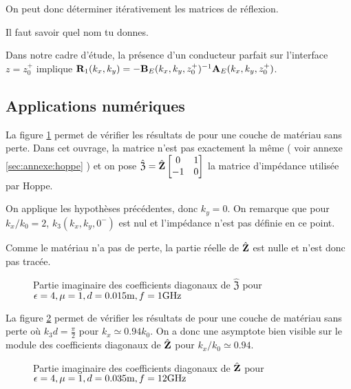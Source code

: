     On peut donc déterminer itérativement les matrices de réflexion.
    \begin{REM}
      Il faut savoir quel nom tu donnes.
    \end{REM}
    Dans notre cadre d'étude, la présence d'un conducteur parfait sur l'interface \(z=z_0^+\) implique \(\mathbf{R}_{1}(k_x,k_y) = -\mathbf{B}_E(k_x,k_y,z_0^+)^{-1}\mathbf{A}_E(k_x,k_y,z_0^+)\).

\subsection{Applications numériques}

  La figure \ref{fig:imp_fourier:plan:hoppe} permet de vérifier les résultats de \cite[p.~33]{hoppe_impedance_1995} pour une couche de matériau sans perte. Dans cet ouvrage, la matrice n’est pas exactement la même ( voir annexe \ref{sec:annexe:hoppe} ) et on pose \(\hat{\mathfrak{Z}} = \hat{\mathbf{Z}}\begin{bmatrix}0&1\\-1&0\end{bmatrix}\) la matrice d'impédance utilisée par Hoppe.

  On applique les hypothèses précédentes, donc \(k_y=0\). On remarque que pour \(k_x\slash k_0=2\), \(k_3(k_x,k_y,0^-)\) est nul et l'impédance n'est pas définie en ce point. 

  Comme le matériau n'a pas de perte, la partie réelle de \(\hat{\mathfrak{\mathbf{Z}}}\) est nulle et n'est donc pas tracée.
  \begin{figure}[!hbt]
      \centering
      
      \caption[Reproduction résultat Hoppe & Rahmat-Samii p.~33]{Partie imaginaire des coefficients diagonaux de \(\hat{\mathfrak Z}\) pour \(\epsilon = 4, \mu = 1, d=0.015\text{m}, f=1\text{GHz}\)}
      \label{fig:imp_fourier:plan:hoppe}
  \end{figure}

  La figure \ref{fig:imp_fourier:plan:soudais} permet de vérifier les résultats de \cite{soudais_3d_2017} pour une couche de matériau sans perte où \(k_3d = \frac{\pi}{2}\) pour \(k_x \simeq 0.94 k_0\). On a donc une asymptote bien visible sur le module des coefficients diagonaux de \(\hat{\mathbf{Z}}\) pour \(k_x\slash k_0 \simeq 0.94\).
  \begin{figure}[!hbt]
      \centering
      
      \caption[Reproduction résultat P. Soudais p.~11]{Partie imaginaire des coefficients diagonaux de \(\hat{\mathbf{Z}}\) pour \(\epsilon = 4, \mu = 1, d=0.035\text{m}, f=12\text{GHz}\)}
      \label{fig:imp_fourier:plan:soudais}
  \end{figure}

